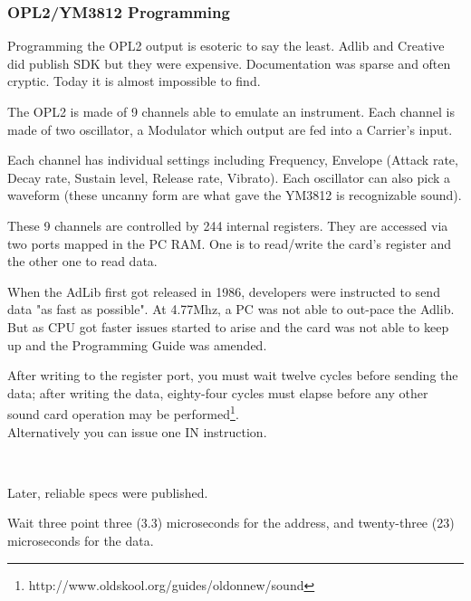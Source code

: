 \subsubsection{OPL2/YM3812 Programming}
\par
Programming the OPL2 output is esoteric to say the least. Adlib and Creative did publish SDK but they were expensive.  Documentation was sparse and often cryptic. Today it is almost impossible to find.\\
\par
The OPL2 is made of 9 channels able to emulate an instrument. Each channel is made of two oscillator, a Modulator which output are fed into a Carrier's input.
\par

Each channel has individual settings including Frequency, Envelope (Attack rate, Decay rate, Sustain level, Release rate, Vibrato). Each oscillator can also pick a waveform (these uncanny form are what gave the YM3812 is recognizable sound).
\par
{}
\par

These 9 channels are controlled by 244 internal registers. They are accessed via two ports mapped in the PC RAM. One is to read/write the card's register and the other one to read data.\\
\par
\begin{minipage}{\textwidth}

\end{minipage}
\par
When the AdLib first got released in 1986, developers were instructed to send data "as fast as possible". At 4.77Mhz, a PC was not able to out-pace the Adlib. But as CPU got faster issues started to arise and the card was not able to keep up and the Programming Guide was amended.\\
\par

\begin{fancyquotes}
After writing to the register port, you must wait twelve cycles before sending the data; after writing the data, eighty-four cycles must elapse before any other sound card operation may be performed\footnote{http://www.oldskool.org/guides/oldonnew/sound}.
 \bigskip \\
 Alternatively you can issue one IN instruction.
 \bigskip \\
 \end{fancyquotes}
\\
\par
Later, reliable specs were published.\\
\par
\begin{fancyquotes}
Wait three point three (3.3) microseconds for the address, and twenty-three (23) microseconds for the data.\\
 \end{fancyquotes}
 

